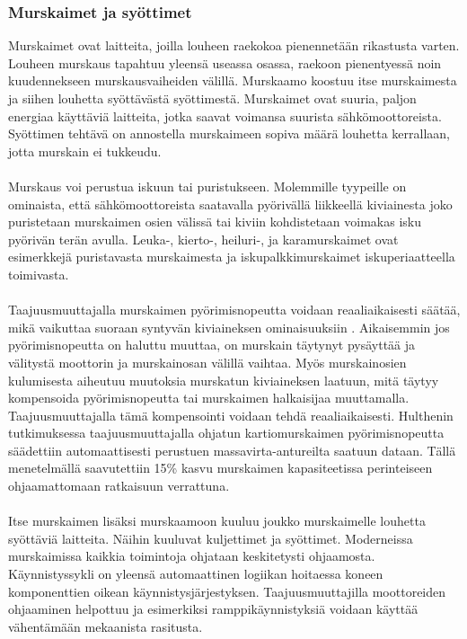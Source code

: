 \documentclass[finnish,12pt,a4paper,pdftex,elec,utf8]{aaltothesis}
\begin{document}
\subsubsection{Murskaimet ja syöttimet} %
Murskaimet ovat laitteita, joilla louheen raekokoa pienennetään rikastusta varten. Louheen murskaus tapahtuu yleensä useassa osassa, raekoon pienentyessä noin kuudennekseen murskausvaiheiden välillä. Murskaamo koostuu itse murskaimesta ja siihen louhetta syöttävästä syöttimestä. Murskaimet ovat suuria, paljon energiaa käyttäviä laitteita, jotka saavat voimansa suurista sähkömoottoreista. Syöttimen tehtävä on annostella murskaimeen sopiva määrä louhetta kerrallaan, jotta murskain ei tukkeudu. \cite[s. 198-199]{Hakapää}
\\\\
Murskaus voi perustua iskuun tai puristukseen. Molemmille tyypeille on ominaista, että sähkömoottoreista saatavalla pyörivällä liikkeellä kiviainesta joko puristetaan murskaimen osien välissä tai kiviin kohdistetaan voimakas isku pyörivän terän avulla. Leuka-, kierto-, heiluri-, ja karamurskaimet ovat esimerkkejä puristavasta murskaimesta ja iskupalkkimurskaimet iskuperiaatteella toimivasta. \cite[s. 200-203]{Hakapää}
\\\\
Taajuusmuuttajalla murskaimen pyörimisnopeutta voidaan reaaliaikaisesti säätää, mikä vaikuttaa suoraan syntyvän kiviaineksen ominaisuuksiin \cite{Hulthen}. Aikaisemmin jos pyörimisnopeutta on haluttu muuttaa, on murskain täytynyt pysäyttää ja välitystä moottorin ja murskainosan välillä vaihtaa. Myös murskainosien kulumisesta aiheutuu muutoksia murskatun kiviaineksen laatuun, mitä täytyy kompensoida pyörimisnopeutta tai murskaimen halkaisijaa muuttamalla. Taajuusmuuttajalla tämä kompensointi voidaan tehdä reaaliaikaisesti. Hulthenin tutkimuksessa \cite{Hulthen} taajuusmuuttajalla ohjatun kartiomurskaimen pyörimisnopeutta säädettiin automaattisesti perustuen massavirta-antureilta saatuun dataan. Tällä menetelmällä saavutettiin 15\% kasvu murskaimen kapasiteetissa perinteiseen ohjaamattomaan ratkaisuun verrattuna.
\\\\
Itse murskaimen lisäksi murskaamoon kuuluu joukko murskaimelle louhetta syöttäviä laitteita. Näihin kuuluvat kuljettimet ja syöttimet. Moderneissa murskaimissa kaikkia toimintoja ohjataan keskitetysti ohjaamosta. Käynnistyssykli on yleensä automaattinen logiikan hoitaessa koneen komponenttien oikean käynnistysjärjestyksen. Taajuusmuuttajilla moottoreiden ohjaaminen helpottuu ja esimerkiksi ramppikäynnistyksiä voidaan käyttää vähentämään mekaanista rasitusta.
\end{document}

